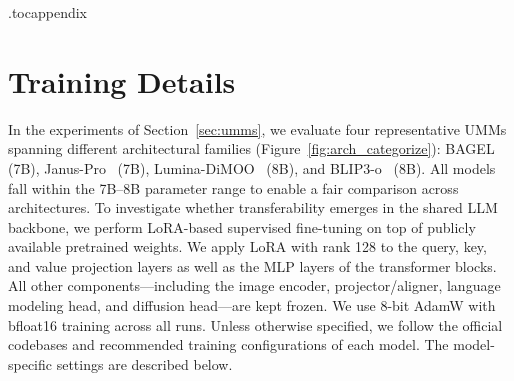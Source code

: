 \etocdepthtag.toc{appendix} %



\clearpage
\section{Training Details}
\label{sec:appendix_experimental_details}

In the experiments of Section~\ref{sec:umms}, we evaluate four representative UMMs spanning different architectural families (Figure~\ref{fig:arch_categorize}): BAGEL~\cite{deng2025bagel} (7B), Janus-Pro~\cite{chen2025januspro} (7B), Lumina-DiMOO~\cite{xin2025lumina} (8B), and BLIP3-o~\cite{chen2505blip3} (8B). All models fall within the 7B–8B parameter range to enable a fair comparison across architectures. To investigate whether transferability emerges in the shared LLM backbone, we perform LoRA-based supervised fine-tuning on top of publicly available pretrained weights. We apply LoRA with rank 128 to the query, key, and value projection layers as well as the MLP layers of the transformer blocks. All other components—including the image encoder, projector/aligner, language modeling head, and diffusion head—are kept frozen. We use 8-bit AdamW with bfloat16 training across all runs. Unless otherwise specified, we follow the official codebases and recommended training configurations of each model. The model-specific settings are described below.

